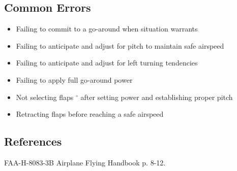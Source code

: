 \subsection{Common Errors}

\begin{itemize}
  \item Failing to commit to a go-around when situation warrants
  \item Failing to anticipate and adjust for pitch to maintain safe airspeed
  \item Failing to anticipate and adjust for left turning tendencies 
  \item Failing to apply full go-around power
  \item Not selecting flaps $^\circ$ after setting power and establishing proper pitch
  \item Retracting flaps before reaching a safe airspeed
\end{itemize}

\subsection{References}

FAA-H-8083-3B Airplane Flying Handbook p. 8-12.
